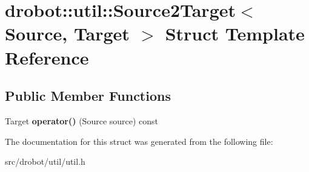 \hypertarget{structdrobot_1_1util_1_1Source2Target}{\section{drobot\-:\-:util\-:\-:Source2\-Target$<$ Source, Target $>$ Struct Template Reference}
\label{structdrobot_1_1util_1_1Source2Target}
}
\subsection*{Public Member Functions}
\begin{DoxyCompactItemize}
\item 
\hypertarget{structdrobot_1_1util_1_1Source2Target_aa64b7be3ffe978effc115e00bfac261d}{Target {\bfseries operator()} (Source source) const }\label{structdrobot_1_1util_1_1Source2Target_aa64b7be3ffe978effc115e00bfac261d}

\end{DoxyCompactItemize}


The documentation for this struct was generated from the following file\-:\begin{DoxyCompactItemize}
\item 
src/drobot/util/util.\-h\end{DoxyCompactItemize}
